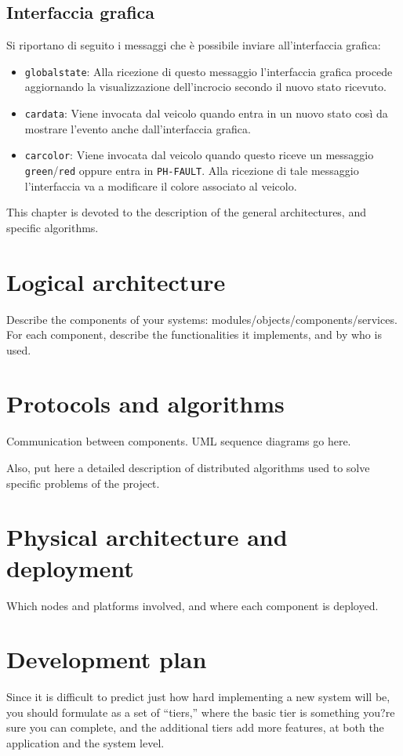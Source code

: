 \documentclass{memoir}
\begin{document}
\subsection{Interfaccia grafica}

Si riportano di seguito i messaggi che è possibile inviare all'interfaccia grafica:
\begin{itemize}
\item \texttt{globalstate}: Alla ricezione di questo messaggio l’interfaccia
  grafica procede aggiornando la visualizzazione dell’incrocio secondo il nuovo
  stato ricevuto.
\item \texttt{cardata}: Viene invocata dal veicolo quando entra in un nuovo
  stato così da mostrare l'evento anche dall'interfaccia grafica.
\item \texttt{carcolor}: Viene invocata dal veicolo quando questo riceve un
  messaggio \texttt{green}/\texttt{red} oppure entra in \texttt{PH-FAULT}. Alla
  ricezione di tale messaggio l’interfaccia va a modificare il colore associato
  al veicolo.
\end{itemize}



\newpage
This chapter is devoted to the description of the general architectures, and specific algorithms.

\section{Logical architecture}
Describe the components of your systems: modules/objects/components/services.
For each component, describe the functionalities it implements, and by who is used.


\section{Protocols and algorithms}
\label{sec:protalg}
Communication between components.  UML sequence diagrams go here.

Also, put here a detailed description of distributed algorithms used to solve specific problems of the project.

\section{Physical architecture and deployment}
Which nodes and platforms involved, and where each component is deployed.

\section{Development plan}
Since it is difficult to predict just how hard implementing a new system will be, you should formulate as a set of ``tiers,'' where the basic tier is something you?re sure you can complete, and the additional tiers add more features, at both the application and the system level.
\end{document}

